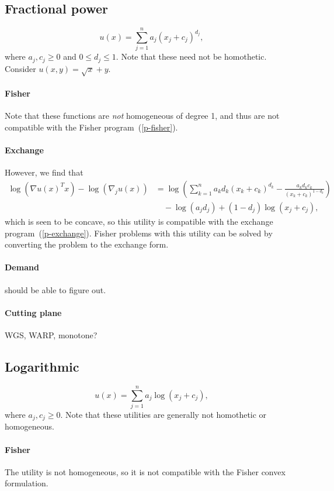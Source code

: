 \documentclass[12pt]{article}
\begin{document}
\subsection{Fractional power}
\[
u(x) = \sum_{j=1}^n a_j (x_j+ c_j)^{d_j},
\]
where $a_j, c_j \geq 0$ and $0 \leq d_j \leq 1$.
Note that these need not be homothetic. Consider $u(x,y) = \sqrt{x} + y$.

\paragraph{Fisher}
Note that these functions are \emph{not} homogeneous of degree 1, and thus
are not compatible with the Fisher program~(\ref{p-fisher}).

\paragraph{Exchange}
However, we find that 
\begin{align*}
\log(\nabla u(x)^T x) - \log(\nabla_j u(x))
&= \log\left(\sum_{k=1}^n a_k d_k (x_k+c_k)^{d_k} - \frac{a_k d_k c_k}{(x_k + c_k)^{1-d_k}} \right)\\
&\quad- \log(a_j d_j) + (1-d_j)\log (x_j + c_j),
\end{align*}
which is seen to be concave, so this utility is compatible with
the exchange program~(\ref{p-exchange}).
Fisher problems with this utility can be solved by converting the
problem to the exchange form.

\paragraph{Demand}
should be able to figure out.

\paragraph{Cutting plane}
WGS, WARP, monotone?


\subsection{Logarithmic}
\[
u(x) = \sum_{j=1}^n a_j \log(x_j+ c_j),
\]
where $a_j, c_j \geq 0$.
Note that these utilities are generally not homothetic or
homogeneous.

\paragraph{Fisher}
The utility is not homogeneous, so it is not compatible
with the Fisher convex formulation.
\end{document}
